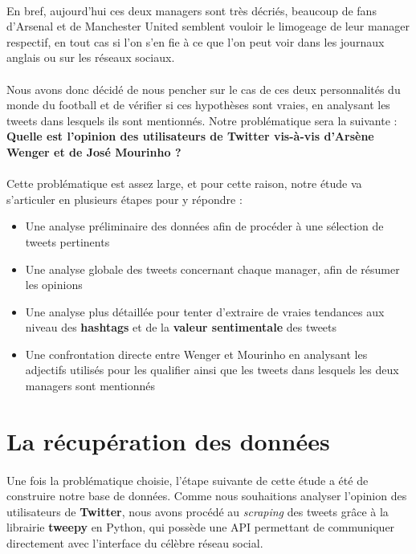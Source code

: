 \documentclass[14pt, openany]{article}
\begin{document}
\paragraph{}
En bref, aujourd'hui ces deux managers sont très décriés, beaucoup de fans d'Arsenal et de Manchester United semblent vouloir le limogeage de leur manager respectif, en tout cas si l'on s'en fie à ce que l'on peut voir dans les journaux anglais ou sur les réseaux sociaux.
\paragraph{}
Nous avons donc décidé de nous pencher sur le cas de ces deux personnalités du monde du football et de vérifier si ces hypothèses sont vraies, en analysant les tweets dans lesquels ils sont mentionnés. Notre problématique sera la suivante : \textbf{Quelle est l'opinion des utilisateurs de Twitter vis-à-vis d'Arsène Wenger et de José Mourinho ?}
\paragraph{}
Cette problématique est assez large, et pour cette raison, notre étude va s'articuler en plusieurs étapes pour y répondre :
\begin{itemize}
\item Une analyse préliminaire des données afin de procéder à une sélection de tweets pertinents
\item Une analyse globale des tweets concernant chaque manager, afin de résumer les opinions
\item Une analyse plus détaillée pour tenter d'extraire de vraies tendances aux niveau des \textbf{hashtags} et de la \textbf{valeur sentimentale} des tweets
\item Une confrontation directe entre Wenger et Mourinho en analysant les adjectifs utilisés pour les qualifier ainsi que les tweets dans lesquels les deux managers sont mentionnés
\end{itemize}
\newpage
\section{La récupération des données}
\paragraph{}
Une fois la problématique choisie, l'étape suivante de cette étude a été de construire notre base de données. Comme nous souhaitions analyser l'opinion des utilisateurs de \textbf{Twitter}, nous avons procédé au \textit{scraping} des tweets grâce à la librairie \textbf{tweepy} en Python, qui possède une API permettant de communiquer directement avec l'interface du célèbre réseau social.
\end{document}
